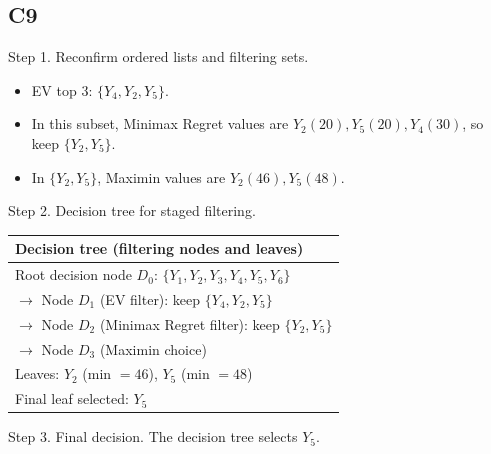 \begin{ExamProblems}
		\subsection*{C9}
		Step 1. Reconfirm ordered lists and filtering sets.
		\begin{itemize}
			\item EV top 3: $\{Y_4,Y_2,Y_5\}$.
			\item In this subset, Minimax Regret values are $Y_2(20),Y_5(20),Y_4(30)$, so keep $\{Y_2,Y_5\}$.
			\item In $\{Y_2,Y_5\}$, Maximin values are $Y_2(46),Y_5(48)$.
		\end{itemize}

		Step 2. Decision tree for staged filtering.
		\begin{center}
			\begin{tabular}{l}
				\toprule
				Decision tree (filtering nodes and leaves) \\
				\midrule
				Root decision node $D_0$: $\{Y_1,Y_2,Y_3,Y_4,Y_5,Y_6\}$ \\
				$\rightarrow$ Node $D_1$ (EV filter): keep $\{Y_4,Y_2,Y_5\}$ \\
				$\rightarrow$ Node $D_2$ (Minimax Regret filter): keep $\{Y_2,Y_5\}$ \\
				$\rightarrow$ Node $D_3$ (Maximin choice) \\
				Leaves: $Y_2$ (min $=46$), $Y_5$ (min $=48$) \\
				Final leaf selected: $Y_5$ \\
				\bottomrule
			\end{tabular}
		\end{center}

		Step 3. Final decision.
		The decision tree selects $Y_5$.
	\end{ExamProblems}

